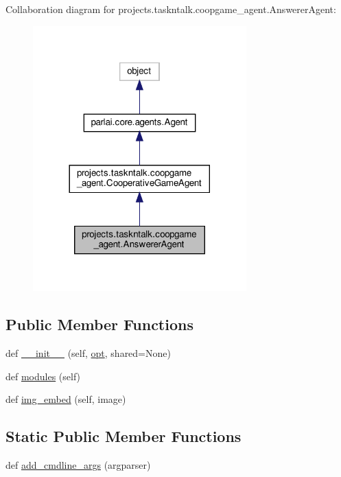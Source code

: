 Collaboration diagram for projects.\+taskntalk.\+coopgame\+\_\+agent.\+Answerer\+Agent\+:\nopagebreak
\begin{figure}[H]
\begin{center}
\leavevmode
\includegraphics[width=233pt]{d8/d95/classprojects_1_1taskntalk_1_1coopgame__agent_1_1AnswererAgent__coll__graph}
\end{center}
\end{figure}
\subsection*{Public Member Functions}
\begin{DoxyCompactItemize}
\item 
def \hyperlink{classprojects_1_1taskntalk_1_1coopgame__agent_1_1AnswererAgent_a7781c189ee128bbbf7c59536411a5cd8}{\+\_\+\+\_\+init\+\_\+\+\_\+} (self, \hyperlink{classparlai_1_1core_1_1agents_1_1Agent_ab3b45d2754244608c75d4068b90cd051}{opt}, shared=None)
\item 
def \hyperlink{classprojects_1_1taskntalk_1_1coopgame__agent_1_1AnswererAgent_ae75c09cc8f494a77e625a577fea676ec}{modules} (self)
\item 
def \hyperlink{classprojects_1_1taskntalk_1_1coopgame__agent_1_1AnswererAgent_a866af3a411fe6c7d10e34306ea0d681b}{img\+\_\+embed} (self, image)
\end{DoxyCompactItemize}
\subsection*{Static Public Member Functions}
\begin{DoxyCompactItemize}
\item 
def \hyperlink{classprojects_1_1taskntalk_1_1coopgame__agent_1_1AnswererAgent_a41be165d9cb3245e1f41be573020308e}{add\+\_\+cmdline\+\_\+args} (argparser)
\end{DoxyCompactItemize}
